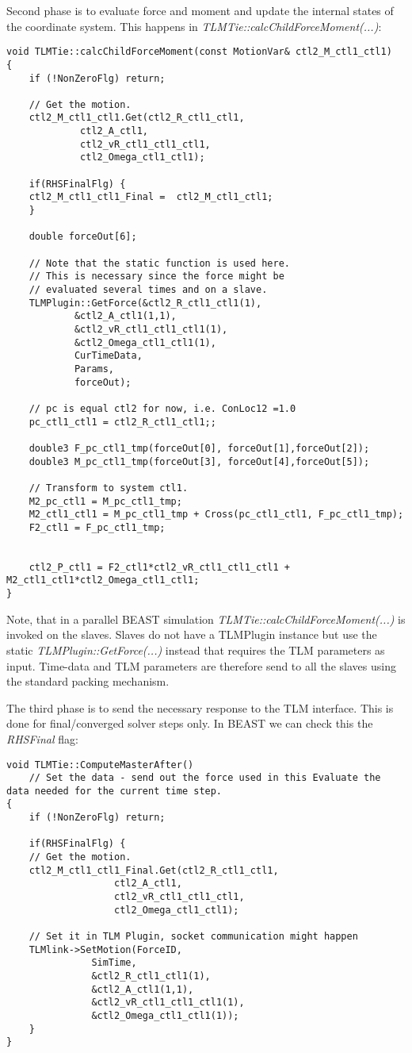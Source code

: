 Second phase is to evaluate force and moment and update the internal states of the coordinate system. 
This happens in {\em TLMTie::calcChildForceMoment(...)}:

{\scriptsize
\begin{verbatim}
void TLMTie::calcChildForceMoment(const MotionVar& ctl2_M_ctl1_ctl1)
{
    if (!NonZeroFlg) return;

    // Get the motion.
    ctl2_M_ctl1_ctl1.Get(ctl2_R_ctl1_ctl1,
			 ctl2_A_ctl1,
			 ctl2_vR_ctl1_ctl1_ctl1,
			 ctl2_Omega_ctl1_ctl1);

    if(RHSFinalFlg) {
	ctl2_M_ctl1_ctl1_Final =  ctl2_M_ctl1_ctl1;
    }

    double forceOut[6];

    // Note that the static function is used here.
    // This is necessary since the force might be
    // evaluated several times and on a slave.
    TLMPlugin::GetForce(&ctl2_R_ctl1_ctl1(1),
			&ctl2_A_ctl1(1,1),
			&ctl2_vR_ctl1_ctl1_ctl1(1),
			&ctl2_Omega_ctl1_ctl1(1),
			CurTimeData,
			Params,
			forceOut);

    // pc is equal ctl2 for now, i.e. ConLoc12 =1.0
    pc_ctl1_ctl1 = ctl2_R_ctl1_ctl1;;

    double3 F_pc_ctl1_tmp(forceOut[0], forceOut[1],forceOut[2]);
    double3 M_pc_ctl1_tmp(forceOut[3], forceOut[4],forceOut[5]);

    // Transform to system ctl1.
    M2_pc_ctl1 = M_pc_ctl1_tmp;
    M2_ctl1_ctl1 = M_pc_ctl1_tmp + Cross(pc_ctl1_ctl1, F_pc_ctl1_tmp);
    F2_ctl1 = F_pc_ctl1_tmp;


    ctl2_P_ctl1 = F2_ctl1*ctl2_vR_ctl1_ctl1_ctl1 + M2_ctl1_ctl1*ctl2_Omega_ctl1_ctl1;
}
\end{verbatim}
}

Note, that in a parallel BEAST simulation {\em TLMTie::calcChildForceMoment(...)} is invoked on the slaves. 
Slaves do not have a TLMPlugin instance but use the static {\em TLMPlugin::GetForce(...)} instead that requires the TLM parameters as input. 
Time-data and TLM parameters are therefore send to all the slaves using the standard packing mechanism.

The third phase is to send the necessary response to the TLM interface. 
This is done for final/converged solver steps only. 
In BEAST we can check this the {\em RHSFinal} flag:

{\scriptsize
\begin{verbatim}
void TLMTie::ComputeMasterAfter()
    // Set the data - send out the force used in this Evaluate the data needed for the current time step.
{
    if (!NonZeroFlg) return;

    if(RHSFinalFlg) {
	// Get the motion.
	ctl2_M_ctl1_ctl1_Final.Get(ctl2_R_ctl1_ctl1,
				   ctl2_A_ctl1,
				   ctl2_vR_ctl1_ctl1_ctl1,
				   ctl2_Omega_ctl1_ctl1);

	// Set it in TLM Plugin, socket communication might happen
	TLMlink->SetMotion(ForceID,
			   SimTime,
			   &ctl2_R_ctl1_ctl1(1),
			   &ctl2_A_ctl1(1,1),
			   &ctl2_vR_ctl1_ctl1_ctl1(1),
			   &ctl2_Omega_ctl1_ctl1(1));
    }
}
\end{verbatim}
}


